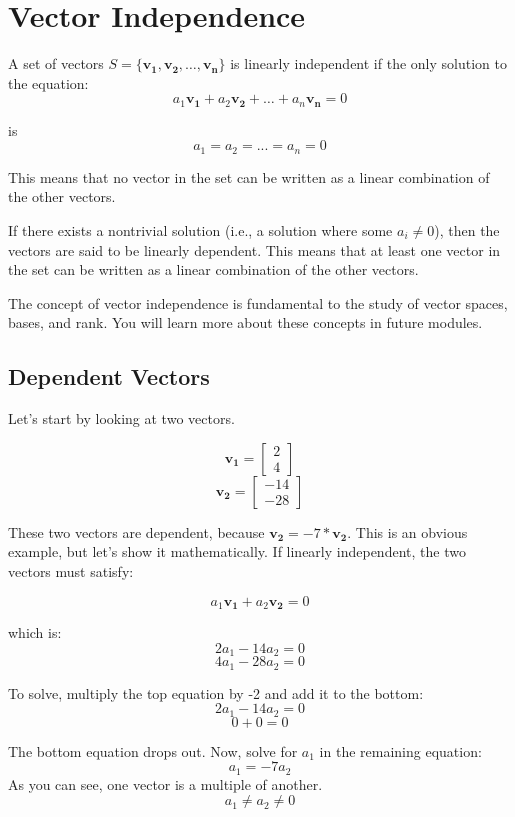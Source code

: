 \section{Vector Independence}
A set of vectors $S = \{\mathbf{v_1}, \mathbf{v_2}, \dots, \mathbf{v_n}\}$ is 
linearly independent if the only solution to the equation:
$$a_1 \mathbf{v_1} + a_2 \mathbf{v_2} + \dots + a_n \mathbf{v_n} = 0$$

is 
$$a_1 = a_2 = ... = a_n = 0$$ 

This means that no vector in the set can be written as a linear combination of 
the other vectors.

If there exists a nontrivial solution (i.e., a solution where some $a_i \neq 
0$), then the vectors are said to be linearly dependent. This means that at 
least one vector in the set can be written as a linear combination of the 
other vectors.

The concept of vector independence is fundamental to the study of vector 
spaces, bases, and rank. You will learn more about these concepts in future 
modules. 

\subsection{Dependent Vectors}
Let's start by looking at two vectors. 

$$\mathbf{v_1} = \begin{bmatrix}
			2 \\
			4
		\end{bmatrix}$$
$$\mathbf{v_2} = \begin{bmatrix}
			-14 \\
			-28
\end{bmatrix}$$

These two vectors are dependent, because $\mathbf{v_2} = -7*\mathbf{v_2}$. This is an obvious example, but let's show it mathematically. If linearly independent, the two vectors must satisfy:

	$$a_1 \mathbf{v_1} + a_2 \mathbf{v_2} = 0$$

which is:
	$$2a_1 -14a_2 = 0$$
	$$4a_1 -28a_2 = 0$$

To solve, multiply the top equation by -2 and add it to the bottom: 
$$2a_1 - 14a_2 = 0 $$
$$ 0  + 0     = 0 $$

The bottom equation drops out. Now,  solve for $a_1$ in the remaining equation:
$$a_1 = -7a_2$$
As you can see, one vector is a multiple of another. $$a_1 \neq a_2 \neq 0$$

